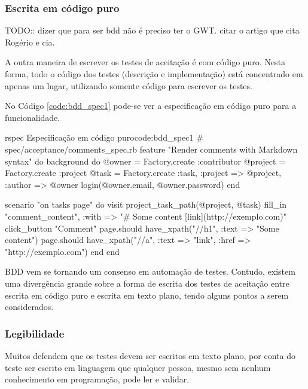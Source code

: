 

\subsubsection{Escrita em código puro} %
\label{subsub:Escrita em codigo puro}

TODO:: dizer que para ser bdd não é preciso ter o GWT. citar o artigo que cita Rogério e cia.

A outra maneira de escrever os testes de aceitação é com código puro. Nesta forma, todo o código dos testes (descrição e implementação) está concentrado em apenas um lugar, utilizando somente código para escrever os testes.

No Código \ref{code:bdd_spec1} pode-se ver a especificação em código puro para a funcionalidade.

\begin{mycode}{rspec}%
{Especificação em código puro}{code:bdd_spec1}
# spec/acceptance/comments_spec.rb
feature "Render comments with Markdown syntax" do
  background do
    @owner = Factory.create :contributor
    @project = Factory.create :project
    @task = Factory.create :task, :project => @project, :author => @owner
    login(@owner.email, @owner.password)
  end

  scenario "on tasks page" do
    visit project_task_path(@project, @task)
    fill_in "comment_content", :with => "# Some content [link](http://exemplo.com)"
    click_button "Comment"
    page.should have_xpath("//h1", :text => "Some content")
    page.should have_xpath("//a", :text => "link", :href => "http://exemplo.com")
  end
end
\end{mycode}


BDD vem se tornando um consenso em automação de testes. Contudo, existem uma divergência grande sobre a forma de escrita dos testes de aceitação entre escrita em código puro e escrita em texto plano, tendo alguns pontos a serem considerados.

\subsubsection{Legibilidade} %
\label{subsub:legibilidade}

Muitos defendem que os testes devem ser escritos em texto plano, por conta do teste ser escrito em linguagem que qualquer pessoa, mesmo sem nenhum conhecimento em programação, pode ler e validar.

